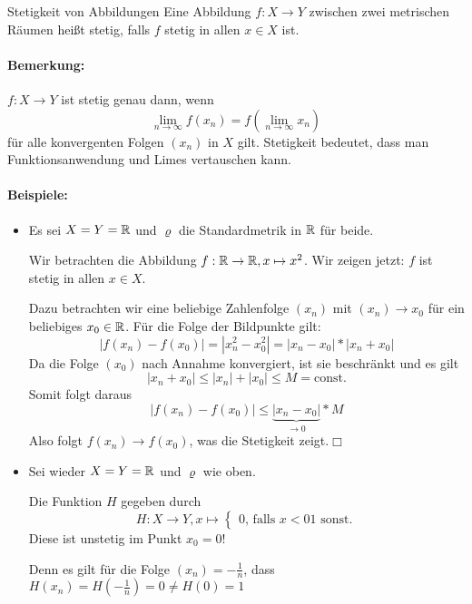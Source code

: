 \begin{definition}{Stetigkeit von Abbildungen}
	Eine Abbildung $f:X\rightarrow Y$ zwischen zwei metrischen Räumen heißt stetig, falls $f$ stetig in allen $x\in X$ ist.
\end{definition}

\paragraph{Bemerkung:}
$f:X\rightarrow Y$ ist stetig genau dann, wenn
\begin{equation*}
	\lim\limits_{n\to\infty}f(x_n)=f(\lim\limits_{n\to\infty}x_n)
\end{equation*}
für alle konvergenten Folgen $(x_n)$ in $X$ gilt.
Stetigkeit bedeutet, dass man Funktionsanwendung und Limes vertauschen kann.

\paragraph{Beispiele:}
\begin{itemize}
	\item Es sei $X=Y=\mathbb{R}$ und $\varrho$ die Standardmetrik in $\mathbb{R}$ für beide.

	Wir betrachten die Abbildung $f:\mathbb{R}\rightarrow\mathbb{R},x\mapsto x^2$. Wir zeigen jetzt: $f$ ist stetig in allen $x\in X$.

	Dazu betrachten wir eine beliebige Zahlenfolge $(x_n)$ mit $(x_n)\to x_0$ für ein beliebiges $x_0\in\mathbb{R}$.
	Für die Folge der Bildpunkte gilt:
	\begin{equation*}
		|f(x_n)-f(x_0)|=|x_n^2-x_0^2|=|x_n-x_0|*|x_n+x_0|
	\end{equation*}
	Da die Folge $(x_0)$ nach Annahme konvergiert, ist sie beschränkt und es gilt
	\begin{equation*}
		|x_n+x_0|\leq|x_n|+|x_0|\leq M=\mathrm{const.}
	\end{equation*}
	Somit folgt daraus
	\begin{equation*}
		|f(x_n)-f(x_0)|\leq\underbrace{|x_n-x_0|}_{\to 0}*M
	\end{equation*}
	Also folgt $f(x_n)\to f(x_0)$, was die Stetigkeit zeigt.\hfill$\Box$

	\item Sei wieder $X=Y=\mathbb{R}$ und $\varrho$ wie oben.

	Die Funktion $H$ gegeben durch
	\begin{equation*}
		H:X\rightarrow Y, x\mapsto
		\begin{cases}
			0 \text{, falls }x<0
			1 \text{ sonst.}
		\end{cases}
	\end{equation*}
	Diese ist unstetig im Punkt $x_0=0$!

	Denn es gilt für die Folge $(x_n)=-\frac 1n$, dass $H(x_n)=H(-\frac 1n)=0\neq H(0)=1$
\end{itemize}

